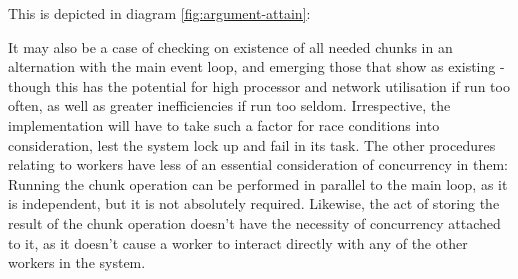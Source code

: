This is depicted in diagram \cref{fig:argument-attain}:


It may also be a case of checking on existence of all needed chunks in
an alternation with the main event loop, and emerging those that show as
existing - though this has the potential for high processor and network
utilisation if run too often, as well as greater inefficiencies if run
too seldom. Irrespective, the implementation will have to take such a
factor for race conditions into consideration, lest the system lock up
and fail in its task. The other procedures relating to workers have less
of an essential consideration of concurrency in them: Running the chunk
operation can be performed in parallel to the main loop, as it is
independent, but it is not absolutely required. Likewise, the act of
storing the result of the chunk operation doesn't have the necessity of
concurrency attached to it, as it doesn't cause a worker to interact
directly with any of the other workers in the system.
